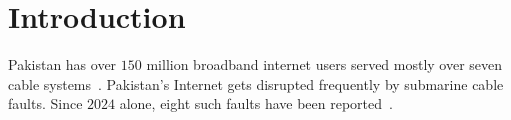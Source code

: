 \documentclass[sigconf,anonymous,10pt]{acmart}
\newcommand{\hlnew}[1]{{\sethlcolor{newhl}\hl{#1}}}
\begin{document}

\maketitle



\section{Introduction}
Pakistan has over $150$ million broadband internet users served mostly over seven cable systems~\mbox{\cite{pta2026telecom}}. Pakistan's Internet gets disrupted frequently by submarine cable faults. Since $2024$ alone, eight such faults have been reported~\cite{subtelforum2024pakistan, tribune2025aae1, aljazeera2025redsea, arabnews2025maintenance, pta2026smw5}.


\end{document}

